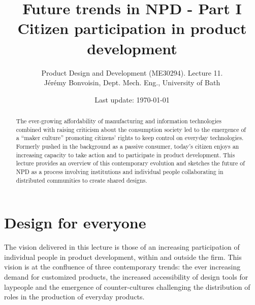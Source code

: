 \documentclass{article}
\begin{document}
\title{Future trends in NPD - Part I\\Citizen participation in product development}

\author{Product Design and Development (ME30294). Lecture 11. \\ Jérémy Bonvoisin, Dept. Mech. Eng., University of Bath}
\date{Last update: \today}

\maketitle

\begin{abstract}
The ever-growing affordability of manufacturing and information technologies combined with raising criticism about the consumption society led to the emergence of a ``maker culture'' promoting citizens' rights to keep control on everyday technologies. Formerly pushed in the background as a passive consumer, today's citizen enjoys an increasing capacity to take action and to participate in product development. This lecture provides an overview of this contemporary evolution and sketches the future of NPD as a process involving institutions and individual people collaborating in distributed communities to create shared designs.
\end{abstract}

\tableofcontents

\section{Design for everyone}
\label{sec:context}
The vision delivered in this lecture is those of an increasing participation of individual people in product development, within and outside the firm. This vision is at the confluence of three contemporary trends: the ever increasing demand for customized products, the increased accessibility of design tools for laypeople and the emergence of counter-cultures challenging the distribution of roles in the production of everyday products. 
\end{document}
